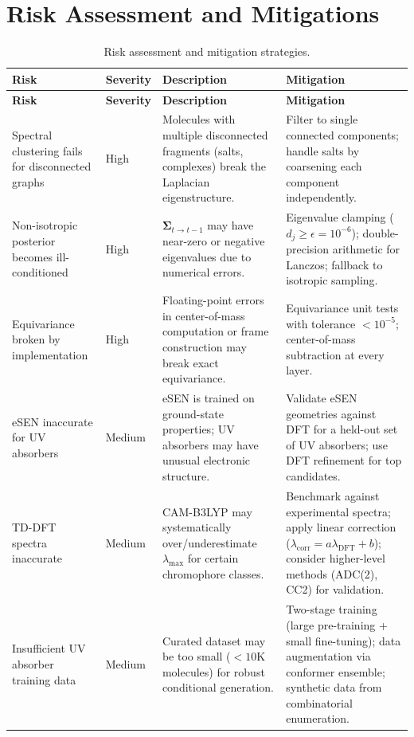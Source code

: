 \documentclass[12pt,a4paper]{article}
\newcommand{\bSigma}{\bm{\Sigma}}
\begin{document}
\section{Risk Assessment and Mitigations}\label{sec:risks}

\begin{longtable}{p{3.5cm}p{1.5cm}p{4cm}p{4cm}}
\caption{Risk assessment and mitigation strategies.}\label{tab:risks} \\
\toprule
\textbf{Risk} & \textbf{Severity} & \textbf{Description} & \textbf{Mitigation} \\
\midrule
\endfirsthead
\toprule
\textbf{Risk} & \textbf{Severity} & \textbf{Description} & \textbf{Mitigation} \\
\midrule
\endhead
Spectral clustering fails for disconnected graphs & High & Molecules with multiple disconnected fragments (salts, complexes) break the Laplacian eigenstructure. & Filter to single connected components; handle salts by coarsening each component independently. \\
\midrule
Non-isotropic posterior becomes ill-conditioned & High & $\bSigma_{t \to t-1}$ may have near-zero or negative eigenvalues due to numerical errors. & Eigenvalue clamping ($d_j \geq \epsilon = 10^{-6}$); double-precision arithmetic for Lanczos; fallback to isotropic sampling. \\
\midrule
Equivariance broken by implementation & High & Floating-point errors in center-of-mass computation or frame construction may break exact equivariance. & Equivariance unit tests with tolerance $< 10^{-5}$; center-of-mass subtraction at every layer. \\
\midrule
eSEN inaccurate for UV absorbers & Medium & eSEN is trained on ground-state properties; UV absorbers may have unusual electronic structure. & Validate eSEN geometries against DFT for a held-out set of UV absorbers; use DFT refinement for top candidates. \\
\midrule
TD-DFT spectra inaccurate & Medium & CAM-B3LYP may systematically over/underestimate $\lambda_{\max}$ for certain chromophore classes. & Benchmark against experimental spectra; apply linear correction ($\lambda_{\text{corr}} = a \lambda_{\text{DFT}} + b$); consider higher-level methods (ADC(2), CC2) for validation. \\
\midrule
Insufficient UV absorber training data & Medium & Curated dataset may be too small ($< 10$K molecules) for robust conditional generation. & Two-stage training (large pre-training + small fine-tuning); data augmentation via conformer ensemble; synthetic data from combinatorial enumeration. \\

\end{longtable}
\end{document}
